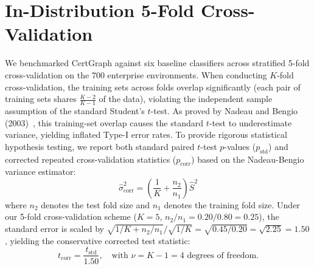 \section{In-Distribution 5-Fold Cross-Validation}
We benchmarked CertGraph against six baseline classifiers across stratified 5-fold cross-validation on the 700 enterprise environments. When conducting $K$-fold cross-validation, the training sets across folds overlap significantly (each pair of training sets shares $\frac{K-2}{K-1}$ of the data), violating the independent sample assumption of the standard Student's $t$-test. As proved by Nadeau and Bengio (2003)~\cite{nadeau2003inference}, this training-set overlap causes the standard $t$-test to underestimate variance, yielding inflated Type-I error rates. To provide rigorous statistical hypothesis testing, we report both standard paired $t$-test $p$-values ($p_{\text{std}}$) and corrected repeated cross-validation statistics ($p_{\text{corr}}$) based on the Nadeau-Bengio variance estimator:
\begin{equation}
\hat{\sigma}^2_{\text{corr}} = \left( \frac{1}{K} + \frac{n_2}{n_1} \right) \hat{S}^2
\end{equation}
where $n_2$ denotes the test fold size and $n_1$ denotes the training fold size. Under our 5-fold cross-validation scheme ($K=5$, $n_2/n_1 = 0.20/0.80 = 0.25$), the standard error is scaled by $\sqrt{1/K + n_2/n_1} / \sqrt{1/K} = \sqrt{0.45 / 0.20} = \sqrt{2.25} = 1.50$, yielding the conservative corrected test statistic:
\begin{equation}
t_{\text{corr}} = \frac{t_{\text{std}}}{1.50}, \quad \text{with } \nu = K - 1 = 4 \text{ degrees of freedom.}
\end{equation}

